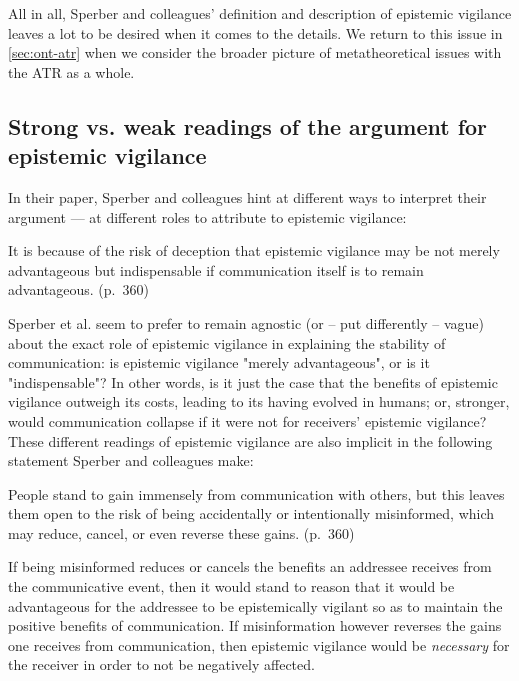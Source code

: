All in all, Sperber and colleagues' definition and description of epistemic vigilance leaves a lot to be desired when it comes to the details. We return to this issue in \cref{sec:ont-atr} when we consider the broader picture of metatheoretical issues with the ATR as a whole.

\subsection{Strong vs. weak readings of the argument for epistemic vigilance}
\label{sec:strong-weak}

In their \citeyear{Sperber10} paper, Sperber and colleagues hint at different ways to interpret their argument --- at different roles to attribute to epistemic vigilance:

\begin{quoting}
    It is because of the risk of deception that epistemic vigilance may be not merely advantageous but indispensable if communication itself is to remain advantageous.
\hfill (p.~360)
\end{quoting}
Sperber et al. seem to prefer to remain agnostic (or -- put differently -- vague) about the exact role of epistemic vigilance in explaining the stability of communication: is epistemic vigilance "merely advantageous", or is it "indispensable"? In other words, is it just the case that the benefits of epistemic vigilance outweigh its costs, leading to its having evolved in humans; or, stronger, would communication collapse if it were not for receivers' epistemic vigilance?
These different readings of epistemic vigilance are also implicit in the following statement Sperber and colleagues make:
\begin{quoting}
    People stand to gain immensely from communication with others, but this leaves them open to the risk of being accidentally or intentionally misinformed, which may reduce, cancel, or even reverse these gains.
\hfill (p.~360)
\end{quoting}
If being misinformed reduces or cancels the benefits an addressee receives from the communicative event, then it would stand to reason that it would be advantageous for the addressee to be epistemically vigilant so as to maintain the positive benefits of communication. If misinformation however reverses the gains one receives from communication, then epistemic vigilance would be \emph{necessary} for the receiver in order to not be negatively affected.

